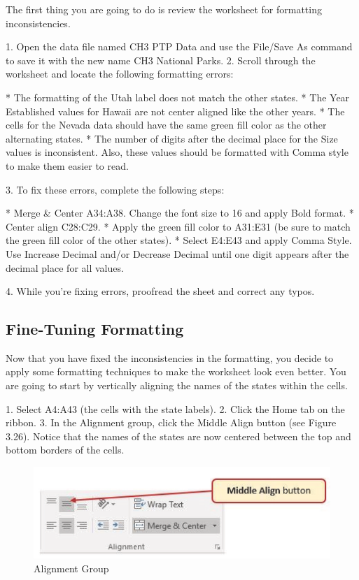 The first thing you are going to do is review the worksheet for formatting inconsistencies.

1. Open the data file named CH3 PTP Data and use the File/Save As command to save it with the
new name CH3 National Parks.
2. Scroll through the worksheet and locate the following formatting errors:

* The formatting of the Utah label does not match the other states.
* The Year Established values for Hawaii are not center aligned like the other years.
* The cells for the Nevada data should have the same green fill color as the other alternating
states.
* The number of digits after the decimal place for the Size values is inconsistent. Also, these
values should be formatted with Comma style to make them easier to read.

3. To fix these errors, complete the following steps:


* Merge \& Center A34:A38. Change the font size to 16 and apply Bold format.
* Center align C28:C29.
* Apply the green fill color to A31:E31 (be sure to match the green fill color of the other states).
* Select E4:E43 and apply Comma Style. Use Increase Decimal and/or Decrease Decimal until one digit appears after the decimal place for all values.

4. While you're fixing errors, proofread the sheet and correct any typos.

\subsection{Fine-Tuning Formatting}

Now that you have fixed the inconsistencies in the formatting, you decide to apply some formatting
techniques to make the worksheet look even better. You are going to start by vertically aligning the
names of the states within the cells.

1. Select A4:A43 (the cells with the state labels).
2. Click the Home tab on the ribbon.
3. In the Alignment group, click the Middle Align button (see Figure 3.26). Notice that the names
of the states are now centered between the top and bottom borders of the cells.


\begin{figure}[H]
	\centering
	\includegraphics[width=\maxwidth{.95\linewidth}]{gfx/ch03_fig27}
	\caption{Alignment Group}
	\label{03:fig27}
\end{figure}



